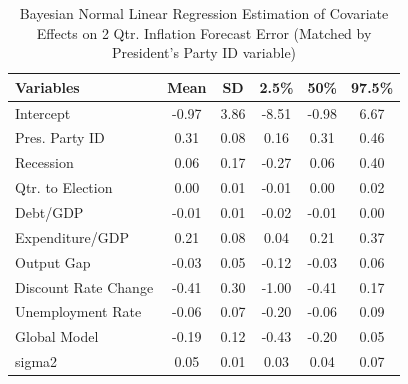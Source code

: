 \documentclass[a4paper]{article}\usepackage{graphicx, color}
\begin{document}
\begin{table}[ht]
\begin{center}
\caption{Bayesian Normal Linear Regression Estimation of Covariate Effects on 2 Qtr. Inflation Forecast Error (Matched by President's Party ID variable)}
\label{OutputPB}
{\small
\begin{tabular}{lccccc}
  \hline
Variables & Mean & SD & 2.5\% & 50\% & 97.5\% \\ 
  \hline
Intercept & -0.97 & 3.86 & -8.51 & -0.98 & 6.67 \\ 
  Pres. Party ID & 0.31 & 0.08 & 0.16 & 0.31 & 0.46 \\ 
  Recession & 0.06 & 0.17 & -0.27 & 0.06 & 0.40 \\ 
  Qtr. to Election & 0.00 & 0.01 & -0.01 & 0.00 & 0.02 \\ 
  Debt/GDP & -0.01 & 0.01 & -0.02 & -0.01 & 0.00 \\ 
  Expenditure/GDP & 0.21 & 0.08 & 0.04 & 0.21 & 0.37 \\ 
  Output Gap & -0.03 & 0.05 & -0.12 & -0.03 & 0.06 \\ 
  Discount Rate Change & -0.41 & 0.30 & -1.00 & -0.41 & 0.17 \\ 
  Unemployment Rate & -0.06 & 0.07 & -0.20 & -0.06 & 0.09 \\ 
  Global Model & -0.19 & 0.12 & -0.43 & -0.20 & 0.05 \\ 
  sigma2 & 0.05 & 0.01 & 0.03 & 0.04 & 0.07 \\ 
   \hline
\end{tabular}
}
\end{center}
\end{table}



\end{document}
